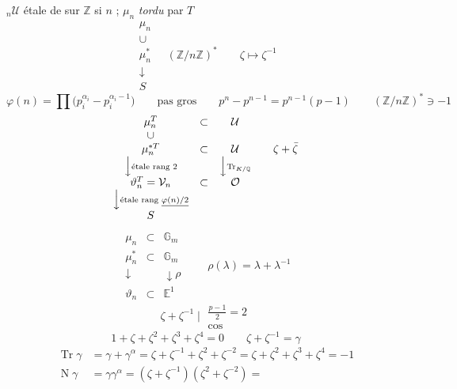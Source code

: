 \documentclass[11pt,a4paper]{article}
\begin{document}
${}_n\mathcal{U}$ étale de  \ill{} sur $\mathbb{Z}$ si $n$  ; \struck{\ill{}} $\mu_n$ \emph{tordu} par $T$
\[
  \begin{array}{c} \mu_n \\ \cup \\ \mu_n^{*} \\ \downarrow \\ S \end{array}
  \quad (\mathbb{Z}/n\mathbb{Z})^{*} \qquad \zeta \longmapsto \zeta^{-1}
\]
\[
  \varphi(n) = \prod \bigl(p_i^{\alpha_i} - p_i^{\alpha_i - 1}\bigr) \qquad \text{pas gros} \qquad p^{n} - p^{n-1} = p^{n-1}(p - 1) \qquad (\mathbb{Z}/n\mathbb{Z})^{*} \ni -1
\]
\[
\begin{array}{ccccc}
  \mu_n^{T} & \subset & \mathcal{U} & & \\
  \cup & & & & \\
  \mu_n^{*T} & \subset & \mathcal{U} & & \zeta + \bar\zeta \\
  \Big\downarrow{\scriptstyle \text{étale rang } 2} & & \Big\downarrow{\scriptstyle \operatorname{Tr}_{K/\mathbb{Q}}} & & \\
  \vartheta_n^{T} = \mathcal{V}_n & \subset & \mathcal{O} & & \\
  \Big\downarrow{\scriptstyle \text{étale rang } \uncertain{\varphi(n)/2}} & & & & \\
  S & & & &
\end{array}
\]
\[
  \begin{array}{ccc}
    \mu_n & \subset & \mathbb{G}_m \\[1ex]
    \mu_n^{*} & \subset & \mathbb{G}_m \\
    \downarrow & & \downarrow{\scriptstyle \rho} \\
    \vartheta_n & \subset & \mathbb{E}^{1}
  \end{array}
  \qquad \rho(\lambda) = \lambda + \lambda^{-1}
\]
\[
  \zeta + \zeta^{-1} \;\Big|\; \begin{array}{l} \frac{p - 1}{2} = 2 \\ \cos \end{array}
\]
\[
  1 + \zeta + \zeta^{2} + \zeta^{3} + \zeta^{4} = 0 \qquad \zeta + \zeta^{-1} = \gamma
\]
\[
\begin{aligned}
  \operatorname{Tr} \gamma &= \gamma + \gamma^{\alpha} = \zeta + \zeta^{-1} + \zeta^{2} + \zeta^{-2} = \zeta + \zeta^{2} + \zeta^{3} + \zeta^{4} = -1 \\
  \operatorname{N} \gamma &= \gamma\gamma^{\alpha} = (\zeta + \zeta^{-1})(\zeta^{2} + \zeta^{-2}) =
\end{aligned}
\]
\end{document}
